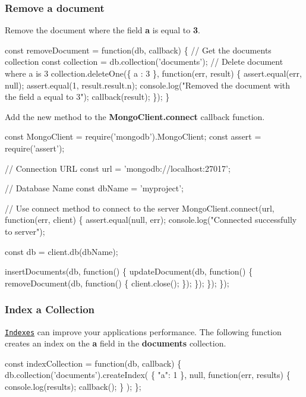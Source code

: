 \subsubsection*{Remove a document}

Remove the document where the field {\bfseries a} is equal to {\bfseries 3}.


\begin{DoxyCode}
const removeDocument = function(db, callback) \{
  // Get the documents collection
  const collection = db.collection('documents');
  // Delete document where a is 3
  collection.deleteOne(\{ a : 3 \}, function(err, result) \{
    assert.equal(err, null);
    assert.equal(1, result.result.n);
    console.log("Removed the document with the field a equal to 3");
    callback(result);
  \});
\}
\end{DoxyCode}


Add the new method to the {\bfseries Mongo\+Client.\+connect} callback function.


\begin{DoxyCode}
const MongoClient = require('mongodb').MongoClient;
const assert = require('assert');

// Connection URL
const url = 'mongodb://localhost:27017';

// Database Name
const dbName = 'myproject';

// Use connect method to connect to the server
MongoClient.connect(url, function(err, client) \{
  assert.equal(null, err);
  console.log("Connected successfully to server");

  const db = client.db(dbName);

  insertDocuments(db, function() \{
    updateDocument(db, function() \{
      removeDocument(db, function() \{
        client.close();
      \});
    \});
  \});
\});
\end{DoxyCode}


\subsubsection*{Index a Collection}

\href{https://docs.mongodb.org/manual/indexes/}{\tt Indexes} can improve your application\textquotesingle{}s performance. The following function creates an index on the {\bfseries a} field in the {\bfseries documents} collection.


\begin{DoxyCode}
const indexCollection = function(db, callback) \{
  db.collection('documents').createIndex(
    \{ "a": 1 \},
      null,
      function(err, results) \{
        console.log(results);
        callback();
    \}
  );
\};
\end{DoxyCode}


